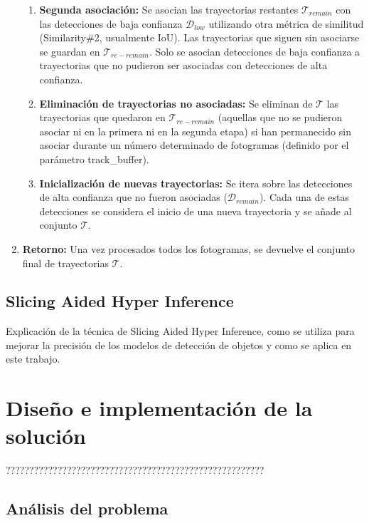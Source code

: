 \documentclass[11pt,spanish,listoffigures,listoftables]{tfgetsinf}
\begin{document}
\begin{enumerate}
{\begin{enumerate}
      \item \textbf{Segunda asociación:} Se asocian las trayectorias restantes $\mathcal{T}_{remain}$ con las detecciones de baja confianza $\mathcal{D}_{low}$ utilizando otra métrica de similitud (Similarity\#2, usualmente IoU). Las trayectorias que siguen sin asociarse se guardan en $\mathcal{T}_{re-remain}$. Solo se asocian detecciones de baja confianza a trayectorias que no pudieron ser asociadas con detecciones de alta confianza.
      \item \textbf{Eliminación de trayectorias no asociadas:} Se eliminan de $\mathcal{T}$ las trayectorias que quedaron en $\mathcal{T}_{re-remain}$ (aquellas que no se pudieron asociar ni en la primera ni en la segunda etapa) si han permanecido sin asociar durante un número determinado de fotogramas (definido por el parámetro track\_buffer).
      \item \textbf{Inicialización de nuevas trayectorias:} Se itera sobre las detecciones de alta confianza que no fueron asociadas ($\mathcal{D}_{remain}$). Cada una de estas detecciones se considera el inicio de una nueva trayectoria y se añade al conjunto $\mathcal{T}$.
   \end{enumerate}
   } %
   \item \textbf{Retorno:} Una vez procesados todos los fotogramas, se devuelve el conjunto final de trayectorias $\mathcal{T}$.
\end{enumerate}




\section{Slicing Aided Hyper Inference}
Explicación de la técnica de Slicing Aided Hyper Inference, como se utiliza para mejorar la precisión de los modelos de detección de objetos y como se aplica en este trabajo.




\chapter{Diseño e implementación de la solución}

???????????????????????????????????????????????????????

\section{Análisis del problema}
\end{document}
